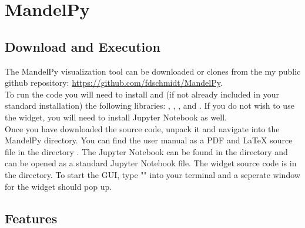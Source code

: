 \documentclass[
  12pt,					%
  a4paper,				%
  twoside,				%
]{report}
\begin{document}
\chapter{MandelPy}

\section{Download and Execution}
The MandelPy visualization tool can be downloaded or clones from the my public github repository: \url{https://github.com/fdschmidt/MandelPy}.\\
To run the code you will need to install {} and (if not already included in your standard installation) the following libraries: {}, {}, {}, and {}. If you do not wish to use the widget, you will need to install Jupyter Notebook as well.\\
Once you have downloaded the source code, unpack it and navigate into the MandelPy directory. You can find the user manual as a PDF and LaTeX source file in the directory {}. The Jupyter Notebook can be found in the {} directory and can be opened as a standard Jupyter Notebook file. The widget source code is in the {} directory. To start the GUI, type "\textbf{{}}" into your terminal and a seperate window for the widget should pop up.


\section{Features}
\end{document}
